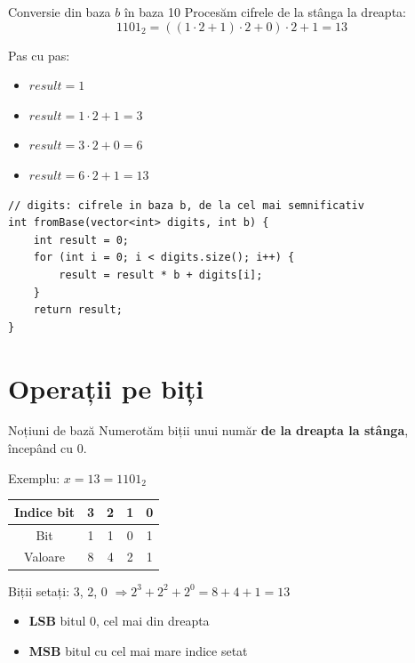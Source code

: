 ﻿\documentclass{beamer}
\begin{document}
\begin{frame}{Conversie din baza $b$ în baza 10}
  Procesăm cifrele de la stânga la dreapta:
  \[
    1101_2 = ((1 \cdot 2 + 1) \cdot 2 + 0) \cdot 2 + 1 = 13
  \]

  Pas cu pas:
  \begin{itemize}
    \item $result = 1$
    \item $result = 1 \cdot 2 + 1 = 3$
    \item $result = 3 \cdot 2 + 0 = 6$
    \item $result = 6 \cdot 2 + 1 = 13$ \checkmark
  \end{itemize}
  \begin{center}
  \begin{lstlisting}
// digits: cifrele in baza b, de la cel mai semnificativ
int fromBase(vector<int> digits, int b) {
    int result = 0;
    for (int i = 0; i < digits.size(); i++) {
        result = result * b + digits[i];
    }
    return result;
}
  \end{lstlisting}
  \end{center}
\end{frame}

\section{Operații pe biți}

\begin{frame}{Noțiuni de bază}
  Numerotăm biții unui număr \textbf{de la dreapta la stânga}, începând cu 0.

  \smallskip
  Exemplu: $x = 13 = 1101_2$
  \smallskip

  \begin{center}
  \begin{tabular}{ccccc}
    \toprule
    Indice bit & 3 & 2 & 1 & 0 \\
    \midrule
    Bit        & 1 & 1 & 0 & 1 \\
    \midrule
    Valoare    & 8 & 4 & 2 & 1 \\
    \bottomrule
  \end{tabular}
  \end{center}

  \medskip
  Biții setați: 3, 2, 0 \quad$\Rightarrow$\quad $2^3 + 2^2 + 2^0 = 8 + 4 + 1 = 13$
  \medskip
  \begin{itemize}
    \item \textbf{LSB} \textemdash{} bitul 0, cel mai din dreapta
    \item \textbf{MSB} \textemdash{} bitul cu cel mai mare indice setat
  \end{itemize}
\end{frame}
\end{document}
